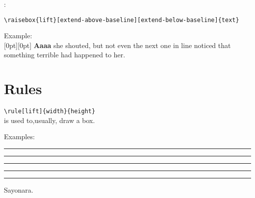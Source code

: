 \documentclass[a4paper,11pt]{article}
\begin{document}
\smallskip
{}:
\begin{verbatim}
\raisebox{lift}[extend-above-baseline][extend-below-baseline]{text}
\end{verbatim}

Example:\\
\raisebox{0pt}[0pt][0pt]{%
\textbf{Aaaa\raisebox{-0.3ex}{a}%
\raisebox{-0.7ex}{aa}%
\raisebox{-1.2ex}{r}%
\raisebox{-2.2ex}{g}%
\raisebox{-4.5ex}{h}}}
she shouted, but not even the next one in line noticed
that something terrible had happened to her.
\section{Rules}

\verb+\rule[lift]{width}{height}+\\
is used to,usually, draw a box.

Examples:
\rule{3mm}{.1pt}%
\rule[-1mm]{5mm}{1cm}%
\rule{3mm}{.1pt}%
\rule[1mm]{1cm}{5mm}%
\rule{3mm}{.1pt}
\flushright
Sayonara.
\end{document}
